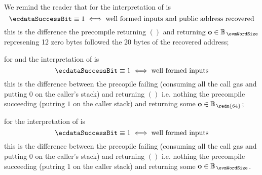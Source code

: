 We remind the reader that
for \instEcrecover{}
the interpretation of \ecdataSuccessBit{} is
\[
	\ecdataSuccessBit \equiv 1 \iff \text{well formed inputs and public address recovered}
\]
this is the difference the precompile returning $()$ and returning $\textbf{o} \in \mathbb{B}_{\,\evmWordSize}$ represening 12 zero bytes followed the 20 bytes of the recovered address;

\par
for \instEcadd{} and \instEcmul{}
the interpretation of \ecdataSuccessBit{} is
\[
	\ecdataSuccessBit \equiv 1 \iff \text{well formed inputs}
\]
this is the difference between
the precopile failing (consuming all the call gas and putting $0$ on the caller's stack) and returning $()$ i.e. nothing
the precompile succeeding (putring $1$ on the caller stack) and returning some $\textbf{o} \in \mathbb{B}_{\,\redm{64}}$;

\par
for \instEcpairing{}
the interpretation of \ecdataSuccessBit{} is
\[
	\ecdataSuccessBit \equiv 1 \iff \text{well formed inputs}
\]
this is the difference between
the precopile failing (consuming all the call gas and putting $0$ on the caller's stack) and returning $()$ i.e. nothing
the precompile succeeding (putring $1$ on the caller stack) and returning some $\textbf{o} \in \mathbb{B}_{\,\evmWordSize}$.
